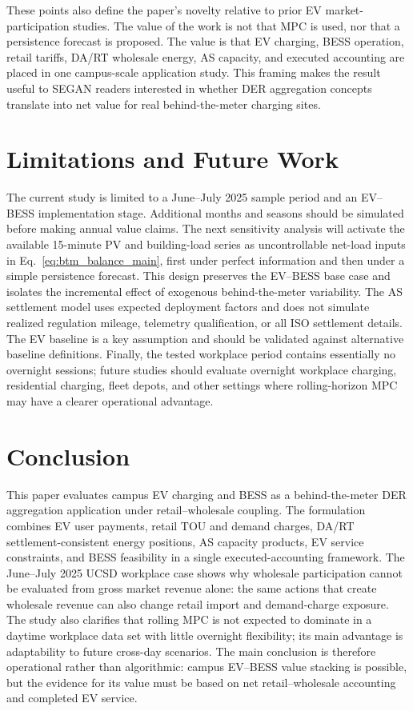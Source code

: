 \documentclass[final,5p,times]{elsarticle}
\begin{document}
These points also define the paper's novelty relative to prior EV market-participation studies. The value of the work is not that MPC is used, nor that a persistence forecast is proposed. The value is that EV charging, BESS operation, retail tariffs, DA/RT wholesale energy, AS capacity, and executed accounting are placed in one campus-scale application study. This framing makes the result useful to SEGAN readers interested in whether DER aggregation concepts translate into net value for real behind-the-meter charging sites.

\section{Limitations and Future Work}
\label{sec:limitations}

The current study is limited to a June--July 2025 sample period and an EV--BESS implementation stage. Additional months and seasons should be simulated before making annual value claims. The next sensitivity analysis will activate the available 15-minute PV and building-load series as uncontrollable net-load inputs in Eq.~\eqref{eq:btm_balance_main}, first under perfect information and then under a simple persistence forecast. This design preserves the EV--BESS base case and isolates the incremental effect of exogenous behind-the-meter variability. The AS settlement model uses expected deployment factors and does not simulate realized regulation mileage, telemetry qualification, or all ISO settlement details. The EV baseline is a key assumption and should be validated against alternative baseline definitions. Finally, the tested workplace period contains essentially no overnight sessions; future studies should evaluate overnight workplace charging, residential charging, fleet depots, and other settings where rolling-horizon MPC may have a clearer operational advantage.

\section{Conclusion}
\label{sec:conclusion}

This paper evaluates campus EV charging and BESS as a behind-the-meter DER aggregation application under retail--wholesale coupling. The formulation combines EV user payments, retail TOU and demand charges, DA/RT settlement-consistent energy positions, AS capacity products, EV service constraints, and BESS feasibility in a single executed-accounting framework. The June--July 2025 UCSD workplace case shows why wholesale participation cannot be evaluated from gross market revenue alone: the same actions that create wholesale revenue can also change retail import and demand-charge exposure. The study also clarifies that rolling MPC is not expected to dominate in a daytime workplace data set with little overnight flexibility; its main advantage is adaptability to future cross-day scenarios. The main conclusion is therefore operational rather than algorithmic: campus EV--BESS value stacking is possible, but the evidence for its value must be based on net retail--wholesale accounting and completed EV service.
\end{document}

